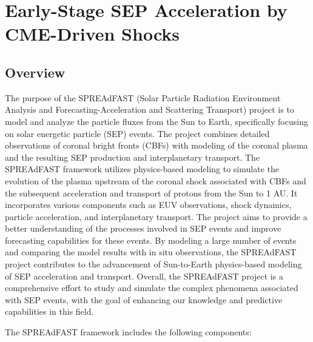 \section{Early-Stage SEP Acceleration by CME-Driven Shocks}
\subsection{Overview}
The purpose of the SPREAdFAST (Solar Particle Radiation Environment Analysis and Forecasting-Acceleration and Scattering Transport) project is to model and analyze the particle fluxes from the Sun to Earth, specifically focusing on solar energetic particle (SEP) events. The project combines detailed observations of coronal bright fronts (CBFs) with modeling of the coronal plasma and the resulting SEP production and interplanetary transport. The SPREAdFAST framework utilizes physics-based modeling to simulate the evolution of the plasma upstream of the coronal shock associated with CBFs and the subsequent acceleration and transport of protons from the Sun to 1 AU. It incorporates various components such as EUV observations, shock dynamics, particle acceleration, and interplanetary transport. The project aims to provide a better understanding of the processes involved in SEP events and improve forecasting capabilities for these events. By modeling a large number of events and comparing the model results with in situ observations, the SPREAdFAST project contributes to the advancement of Sun-to-Earth physics-based modeling of SEP acceleration and transport. Overall, the SPREAdFAST project is a comprehensive effort to study and simulate the complex phenomena associated with SEP events, with the goal of enhancing our knowledge and predictive capabilities in this field.

The SPREAdFAST framework includes the following components:

